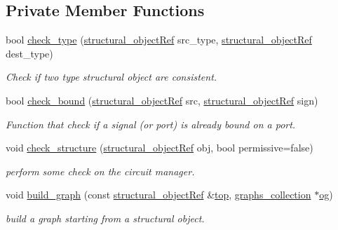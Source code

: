 \subsection*{Private Member Functions}
\begin{DoxyCompactItemize}
\item 
bool \hyperlink{classstructural__manager_a939e3ab0ee909c9008fc787d399a117c}{check\+\_\+type} (\hyperlink{structural__objects_8hpp_a8ea5f8cc50ab8f4c31e2751074ff60b2}{structural\+\_\+object\+Ref} src\+\_\+type, \hyperlink{structural__objects_8hpp_a8ea5f8cc50ab8f4c31e2751074ff60b2}{structural\+\_\+object\+Ref} dest\+\_\+type)
\begin{DoxyCompactList}\small\item\em Check if two type structural object are consistent. \end{DoxyCompactList}\item 
bool \hyperlink{classstructural__manager_aa8a37e742bc04d56360230d1a249445a}{check\+\_\+bound} (\hyperlink{structural__objects_8hpp_a8ea5f8cc50ab8f4c31e2751074ff60b2}{structural\+\_\+object\+Ref} src, \hyperlink{structural__objects_8hpp_a8ea5f8cc50ab8f4c31e2751074ff60b2}{structural\+\_\+object\+Ref} sign)
\begin{DoxyCompactList}\small\item\em Function that check if a signal (or port) is already bound on a port. \end{DoxyCompactList}\item 
void \hyperlink{classstructural__manager_af27b22e329e469a02e83f1066f5a3184}{check\+\_\+structure} (\hyperlink{structural__objects_8hpp_a8ea5f8cc50ab8f4c31e2751074ff60b2}{structural\+\_\+object\+Ref} obj, bool permissive=false)
\begin{DoxyCompactList}\small\item\em perform some check on the circuit manager. \end{DoxyCompactList}\item 
void \hyperlink{classstructural__manager_a67650e28126957ac872f1f747956b1b5}{build\+\_\+graph} (const \hyperlink{structural__objects_8hpp_a8ea5f8cc50ab8f4c31e2751074ff60b2}{structural\+\_\+object\+Ref} \&\hyperlink{tutorial__pact__2019_2Introduction_2second_2module_8c_a363ff33001bb9810eee7a6a61179583b}{top}, \hyperlink{structgraphs__collection}{graphs\+\_\+collection} $\ast$\hyperlink{classstructural__manager_a3262e4c848eaa1b32414f80981c524d4}{og})
\begin{DoxyCompactList}\small\item\em build a graph starting from a structural object. \end{DoxyCompactList}\end{DoxyCompactItemize}
